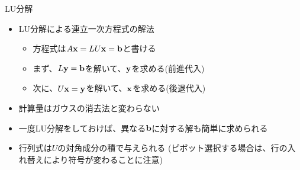 \begin{frame}[t,fragile]{LU分解}
  \begin{itemize}
  \item LU分解による連立一次方程式の解法
    \begin{itemize}
    \item 方程式は$A{\bf x} = LU{\bf x} = {\bf b}$と書ける
    \item まず、$L{\bf y} = {\bf b}$を解いて、${\bf y}$を求める(前進代入)
    \item 次に、$U{\bf x} = {\bf y}$を解いて、${\bf x}$を求める(後退代入)
    \end{itemize}
  \item 計算量はガウスの消去法と変わらない
  \item 一度LU分解をしておけば、異なる${\bf b}$に対する解も簡単に求められる \\[2em]
  \item 行列式は$U$の対角成分の積で与えられる (ピボット選択する場合は、行の入れ替えにより符号が変わることに注意)
  \end{itemize}
\end{frame}
